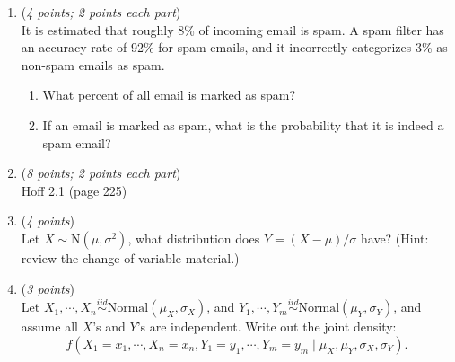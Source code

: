 \documentclass[11pt]{article}
\begin{document}
\begin{enumerate}

    \item ({\it{4 points; 2 points each part}}) \\
    It is estimated that roughly 8\% of incoming email is spam. A spam filter has an accuracy rate of 92\% for spam emails, and it incorrectly categorizes 3\% as non-spam emails as spam.

\begin{enumerate}

\item  What percent of all email is marked as spam?

\item If an email is marked as spam, what is the probability that it is indeed a spam email?

\end{enumerate}
\vspace{2mm}
    \item
    ({\it{8 points; 2 points each part}}) \\
    Hoff 2.1 (page 225)
\vspace{2mm}

    \item 
    ({\it{4 points}}) \\
    Let $X \sim \text{N}(\mu, \sigma^2)$, what distribution does $Y = (X-\mu)/\sigma$ have? (Hint: review the change of variable material.)
    
    

    \item 
    ({\it{3 points}}) \\
    Let $X_1, \cdots, X_n \overset{iid}{\sim} \textrm{Normal}(\mu_X, \sigma_X)$, and $Y_1, \cdots, Y_m \overset{iid}{\sim} \textrm{Normal}(\mu_Y, \sigma_Y)$, and assume all $X$'s and $Y$'s are independent. Write out the joint density:
    $$
    f(X_1 = x_1, \cdots, X_n = x_n, Y_1 = y_1, \cdots, Y_m = y_m \mid \mu_X, \mu_Y, \sigma_X, \sigma_Y).
    $$
    

\end{enumerate}
\end{document}
